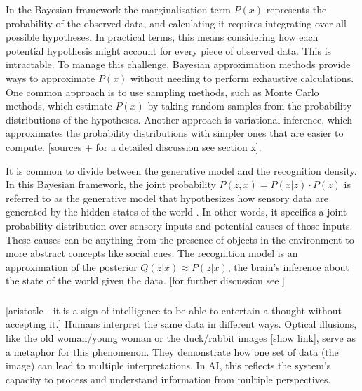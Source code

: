 In the Bayesian framework the marginalisation term \( P(x) \) represents the probability of the observed data, and calculating it requires integrating over all possible hypotheses. In practical terms, this means considering how each potential hypothesis might account for every piece of observed data. This is intractable. To manage this challenge, Bayesian approximation methods provide ways to approximate \( P(x) \) without needing to perform exhaustive calculations. One common approach is to use sampling methods, such as Monte Carlo methods, which estimate 
\( P(x) \) by taking random samples from the probability distributions of the hypotheses. Another approach is variational inference, which approximates the probability distributions with simpler ones that are easier to compute. [sources + for a detailed discussion see section x]. 

It is common to divide between the generative model and the recognition density.
In this Bayesian framework, the joint probability \( P(z, x) = P(x \vert z) \cdot P(z) \) is referred to as the generative model that hypothesizes how sensory data are generated by the hidden states of the world \cite{Ramstead_Kirchhoff_Friston_2020}. In other words, it specifies a joint probability distribution over sensory inputs and potential causes of those inputs. These causes can be anything from the presence of objects in the environment to more abstract concepts like social cues.
The recognition model is an approximation of the posterior \(Q(z \vert x) \approx P(z \vert x) \), the brain's inference about the state of the world given the data.
[for further discussion see ]

\subsubsection{}
[aristotle - it is a sign of intelligence to be able to entertain a thought without accepting it.]
Humans interpret the same data in different ways. 
Optical illusions, like the old woman/young woman or the duck/rabbit images [show link], serve as a metaphor for this phenomenon. They demonstrate how one set of data (the image) can lead to multiple interpretations. In AI, this reflects the system's capacity to process and understand information from multiple perspectives.

